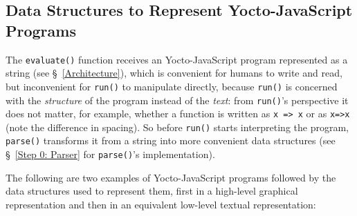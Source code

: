 \documentclass[12pt, oneside]{book}
\begin{document}
\subsection{Data Structures to Represent Yocto-JavaScript Programs}
\label{Data Structures to Represent Yocto-JavaScript Programs}

The \texttt{evaluate()} function receives an Yocto-JavaScript program represented as a string (see §~\ref{Architecture}), which is convenient for humans to write and read, but inconvenient for \texttt{run()} to manipulate directly, because \texttt{run()} is concerned with the \emph{structure} of the program instead of the \emph{text}: from \texttt{run()}’s perspective it does not matter, for example, whether a function is written as \texttt{x => x} or as \texttt{x=>x} (note the difference in spacing). So before \texttt{run()} starts interpreting the program, \texttt{parse()} transforms it from a string into more convenient data structures (see §~\ref{Step 0: Parser} for \texttt{parse()}’s implementation).

The following are two examples of Yocto-JavaScript programs followed by the data structures used to represent them, first in a high-level graphical representation and then in an equivalent low-level textual representation:
\end{document}
